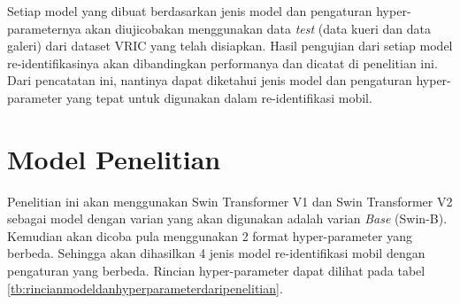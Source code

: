 Setiap model yang dibuat berdasarkan jenis model dan pengaturan hyper-parameternya akan diujicobakan menggunakan data \emph{test} 
(data kueri dan data galeri) dari dataset VRIC yang telah disiapkan. Hasil pengujian dari setiap model
re-identifikasinya akan dibandingkan performanya dan dicatat di penelitian ini. Dari pencatatan ini, nantinya dapat diketahui 
jenis model dan pengaturan hyper-parameter yang tepat untuk digunakan dalam re-identifikasi mobil.

\section{Model Penelitian}
\label{sec:modelpenelitian}

Penelitian ini akan menggunakan Swin Transformer V1 dan Swin Transformer V2 sebagai model dengan varian
yang akan digunakan adalah varian \emph{Base} (Swin-B). Kemudian akan dicoba pula menggunakan 2 format hyper-parameter yang 
berbeda. Sehingga akan dihasilkan 4 jenis model re-identifikasi mobil dengan pengaturan yang berbeda. Rincian hyper-parameter 
dapat dilihat pada tabel \ref{tb:rincianmodeldanhyperparameterdaripenelitian}.

